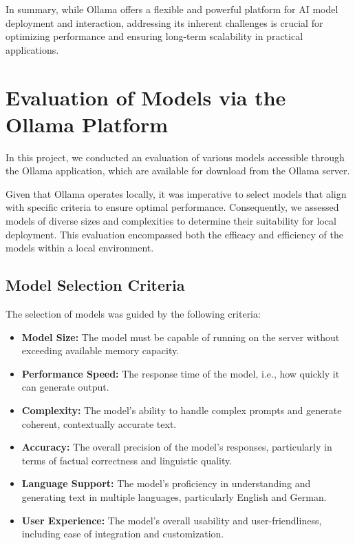 In summary, while Ollama offers a flexible and powerful platform for AI model deployment and interaction, addressing its inherent challenges is crucial for optimizing performance and ensuring long-term scalability in practical applications.

\cite{Ollama-Guide-Cohorte-Projects}


\section{Evaluation of Models via the Ollama Platform}

In this project, we conducted an evaluation of various models accessible through the Ollama application, which are available for download from the Ollama server.

Given that Ollama operates locally, it was imperative to select models that align with specific criteria to ensure optimal performance. 
Consequently, we assessed models of diverse sizes and complexities to determine their suitability for local deployment. 
This evaluation encompassed both the efficacy and efficiency of the models within a local environment.

\cite{Ollama-Download-Website}

\subsection{Model Selection Criteria}

The selection of models was guided by the following criteria:

\begin{itemize}
\item \textbf{Model Size:} The model must be capable of running on the server without exceeding available memory capacity.
\item \textbf{Performance Speed:} The response time of the model, i.e., how quickly it can generate output.
\item \textbf{Complexity:} The model's ability to handle complex prompts and generate coherent, contextually accurate text.
\item \textbf{Accuracy:} The overall precision of the model's responses, particularly in terms of factual correctness and linguistic quality.
\item \textbf{Language Support:} The model's proficiency in understanding and generating text in multiple languages, particularly English and German.
\item \textbf{User Experience:} The model's overall usability and user-friendliness, including ease of integration and customization.
\end{itemize}

